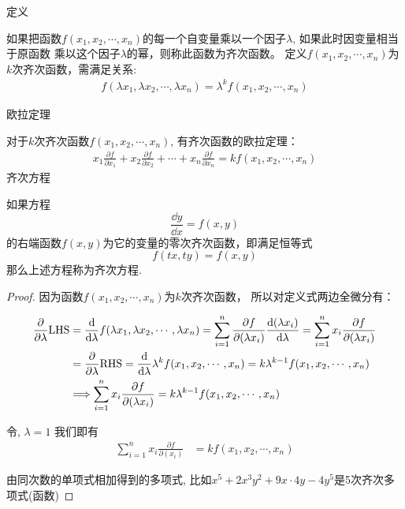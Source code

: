 \begin{definition}[齐次函数]
    \noindent\textsf{定义}

    如果把函数$f(x_1, x_2, \cdots , x_n)$的每一个自变量乘以一个因子$\lambda$, 如果此时因变量相当于原函数
    乘以这个因子$\lambda$的幂，则称此函数为齐次函数。
    定义$f(x_1, x_2, \cdots , x_n)$为$k$次齐次函数，需满足关系:
    \begin{align*}
    f(\lambda x_1, \lambda x_2, \cdots , \lambda x_n) = \lambda^{k} f(x_1, x_2, \cdots , x_n)
    \end{align*} 

    \noindent \textsf{欧拉定理}

    对于$k$次齐次函数$f(x_1, x_2, \cdots , x_n)$, 有齐次函数的欧拉定理：
    \begin{align}
    x_1 \frac{\partial f}{\partial x_1} + x_2 \frac{\partial f}{\partial x_2} + \cdots + x_n \frac{\partial f}{\partial x_n} = kf(x_1, x_2, \cdots , x_n)
\end{align}
\noindent\textsf{齐次方程}

如果方程
\[\frac{\dd y}{\dd x}= f(x, y)\]
的右端函数$f(x, y)$为它的变量的\textsf{零次}齐次函数，即满足恒等式
\[f(tx, ty) = f(x, y)\]
那么上述方程称为齐次方程.
\end{definition}


\begin{proof}
    因为函数$f(x_1, x_2, \cdots , x_n)$为$k$次齐次函数， 所以对定义式两边全微分有：

    \begin{align*}
        \frac{\partial }{\partial \lambda} {\rm LHS} 
            & =\frac{\mathrm{d}}{\mathrm{d}\lambda}f(\lambda x_1, \lambda x_2, \cdots , \lambda x_n)
              = \sum_{i=1}^{n}{\frac{\partial f}{\partial (\lambda x_i)}\frac{\mathrm{d} (\lambda x_i)}{\mathrm{d} \lambda}}
              = \sum_{i=1}^{n}{x_i \frac{\partial f}{\partial (\lambda x_i)}} \\
            & = \frac{\partial }{\partial \lambda} {\rm RHS}
              = \frac{\mathrm{d}}{\mathrm{d} \lambda} \lambda^k f( x_1,  x_2, \cdots ,  x_n) 
              = k \lambda^{k-1}f( x_1,  x_2, \cdots ,  x_n)\\
            & \Longrightarrow \sum_{i=1}^{n}{x_i \frac{\partial f}{\partial (\lambda x_i)}}  = k \lambda^{k-1}f( x_1,  x_2, \cdots ,  x_n)\\
    \end{align*} 

    令, $ \lambda = 1$ 我们即有
    \begin{align*}
        \sum_{i=1}^{n}{x_i \frac{\partial f}{\partial (x_i)}} & = k f( x_1,  x_2, \cdots ,  x_n)
    \end{align*} 
    

    
    由同次数的单项式相加得到的多项式, 比如$x^5 + 2x^3y^2 + 9x\cdot 4y - 4 y^5$是5次齐次多项式(函数)
\end{proof}


